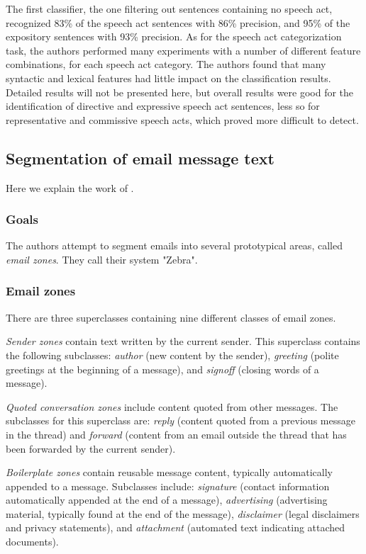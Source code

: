 \documentclass[11pt]{article}
\begin{document}
The first classifier, the one filtering out sentences containing no speech act, recognized 83\% of the speech act sentences with 86\% precision, and 95\% of the expository  sentences with 93\% precision. As for the speech act categorization task, the authors performed many experiments with a number of different feature combinations, for each speech act category. The authors found that many syntactic and lexical features had little impact on the classification results. Detailed results will not be presented here, but overall results were good for the identification of directive and expressive speech act sentences, less so for representative and commissive speech acts, which proved more difficult to detect.

\subsection{Segmentation of email message text}

Here we explain the work of \cite{lampert2009segmenting}.

\subsubsection{Goals}

The authors attempt to segment emails into several prototypical areas, called \textit{email zones}. They call their system "Zebra".

\subsubsection{Email zones}

There are three superclasses containing nine different classes of email zones.

\textit{Sender zones} contain text written by the current sender. This superclass contains the following subclasses: \textit{author} (new content by the sender), \textit{greeting} (polite greetings at the beginning of a message), and \textit{signoff} (closing words of a message).

\textit{Quoted conversation zones} include content quoted from other messages. The subclasses for this superclass are: \textit{reply} (content quoted from a previous message in the thread) and \textit{forward} (content from an email outside the thread that has been forwarded by the current sender).

\textit{Boilerplate zones} contain reusable message content, typically automatically appended to a message. Subclasses include: \textit{signature} (contact information automatically appended at the end of a message), \textit{advertising} (advertising material, typically found at the end of the message), \textit{disclaimer} (legal disclaimers and privacy statements), and \textit{attachment} (automated text indicating attached documents).
\end{document}
